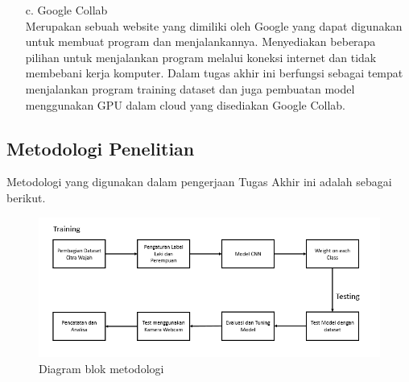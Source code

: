 \begin{itemize}
   \item [c.] Google Collab \\
   Merupakan sebuah website yang dimiliki oleh Google yang dapat digunakan untuk membuat program dan 
   menjalankannya. Menyediakan beberapa pilihan untuk menjalankan program melalui koneksi internet dan 
   tidak membebani kerja komputer. Dalam tugas akhir ini berfungsi sebagai tempat menjalankan program 
   training dataset dan juga pembuatan model menggunakan GPU dalam cloud yang disediakan Google Collab.
\end{itemize}
   

\subsection{Metodologi Penelitian}
Metodologi yang digunakan dalam pengerjaan Tugas Akhir ini adalah sebagai berikut.
    \begin{figure} [H] \centering
      \includegraphics[scale=0.6]{gambar/Metodologi.png}
      \caption{Diagram blok metodologi}
      \label{fig:Metodologi}
    \end{figure}

